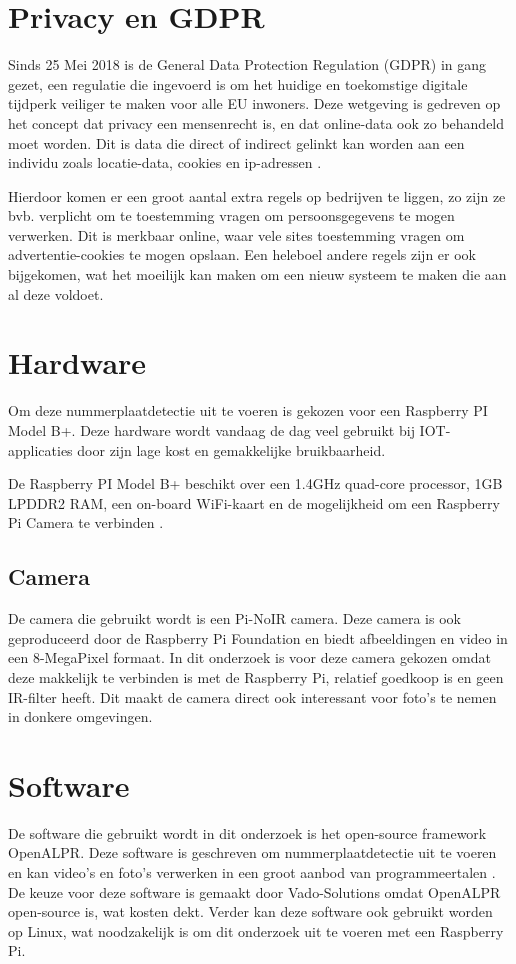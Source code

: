 \section{Privacy en GDPR}
\label{sec:privacy-en-gdpr}

Sinds 25 Mei 2018 is de General Data Protection Regulation (GDPR) in gang gezet, een regulatie die ingevoerd is om het huidige  en toekomstige digitale tijdperk veiliger te maken voor alle EU inwoners.
Deze wetgeving is gedreven op het concept dat privacy een mensenrecht is, en dat online-data ook zo behandeld moet worden. Dit is data die direct of indirect gelinkt kan worden aan een individu zoals locatie-data, cookies en ip-adressen \autocite{goddard2017eu}.

Hierdoor komen er een groot aantal extra regels op bedrijven te liggen, zo zijn ze bvb. verplicht om te toestemming vragen om persoonsgegevens te mogen verwerken. Dit is merkbaar online, waar vele sites toestemming vragen om advertentie-cookies te mogen opslaan. Een heleboel andere regels zijn er ook bijgekomen, wat het moeilijk kan maken om een nieuw systeem te maken die aan al deze voldoet.

\section{Hardware}
Om deze nummerplaatdetectie uit te voeren is gekozen voor een Raspberry PI Model B+. Deze hardware wordt vandaag de dag veel gebruikt bij IOT-applicaties door zijn lage kost en gemakkelijke bruikbaarheid.  

De Raspberry PI Model B+ beschikt over een 1.4GHz quad-core processor, 1GB LPDDR2 RAM, een on-board WiFi-kaart en de mogelijkheid om een Raspberry Pi Camera te verbinden \autocite{raspberrypisitemodelbplus} .

\subsection{Camera}
De camera die gebruikt wordt is een Pi-NoIR camera. Deze camera is ook geproduceerd door de Raspberry Pi Foundation en biedt afbeeldingen en video in een 8-MegaPixel formaat. In dit onderzoek is voor deze camera gekozen omdat deze makkelijk te verbinden is met de Raspberry Pi, relatief goedkoop is en geen IR-filter heeft. Dit maakt de camera direct ook interessant voor foto's te nemen in donkere omgevingen. \autocite{raspberrypisitemodelpinoir}

\section{Software}
De software die gebruikt wordt in dit onderzoek is het open-source framework OpenALPR. Deze software is geschreven om nummerplaatdetectie uit te voeren en kan video's en foto's verwerken in een groot aanbod van programmeertalen \autocite{openalprgithub}. De keuze voor deze software is gemaakt door Vado-Solutions omdat OpenALPR open-source is, wat kosten dekt. Verder kan deze software ook gebruikt worden op Linux, wat noodzakelijk is om dit onderzoek uit te voeren met een Raspberry Pi.